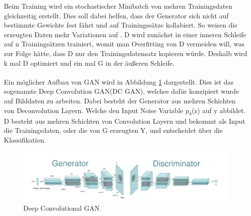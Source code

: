 \documentclass{llncs}
\begin{document}
Beim Training wird ein stochastischer Minibatch von mehren Trainingsdaten gleichzeitig erstellt. Dies soll dabei helfen, dass der Generator sich nicht auf bestimmte Gewichte fest fährt und auf Trainingssätze kollabiert. So weisen die erzeugten Daten mehr Variationen auf \cite{improvingan}. D wird zunächst in einer inneren Schleife auf n Trainingsätzen trainiert, womit man Overfitting von D vermeiden will, was zur Folge hätte, dass D nur den Trainingsdatensatz kopieren würde. Deshalb wird k mal D optimiert und ein mal G in der äußeren Schleife. 
\\\\
Ein möglicher Aufbau von GAN wird in Abbildung \ref{fig:Bild21} dargestellt. Dies ist das sogenannte Deep Convolution GAN(DC GAN), welches dafür konzipiert wurde auf Bilddaten zu arbeiten. Dabei besteht der Generator aus mehren Schichten von Deconvolution Layern. Welche den Input Noise Variable p\textsubscript{z}(z) auf y abbildet. D besteht aus mehren Schichten von Convolution Layern und bekommt als Input die Trainingsdaten, oder die von G erzeugten Y, und entscheidet über die Klassifikation\cite{dcgan}.

\begin{figure}[htbp] 
	\centering
	\includegraphics[width=1.0\textwidth]{dcgan1.png}
	\caption{Deep Convolutional GAN}
	\label{fig:Bild21}
\end{figure}
\end{document}
